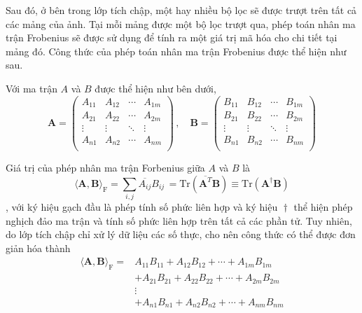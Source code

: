 Sau đó, ở bên trong lớp tích chập, một hay nhiều bộ lọc sẽ được trượt trên tất cả các mảng của ảnh. Tại mỗi mảng được một bộ lọc trượt qua, phép toán nhân ma trận Frobenius sẽ được sử dụng để tính ra một giá trị mã hóa cho chi tiết tại mảng đó. Công thức của phép toán nhân ma trận Frobenius được thể hiện như sau.

Với ma trận $A$ và $B$ được thể hiện như bên dưới,
\begin{equation}
  {\displaystyle \mathbf {A} ={\begin{pmatrix}A_{11}&A_{12}&\cdots &A_{1m}\\A_{21}&A_{22}&\cdots &A_{2m}\\\vdots &\vdots &\ddots &\vdots \\A_{n1}&A_{n2}&\cdots &A_{nm}\\\end{pmatrix}}\,,\quad \mathbf {B} ={\begin{pmatrix}B_{11}&B_{12}&\cdots &B_{1m}\\B_{21}&B_{22}&\cdots &B_{2m}\\\vdots &\vdots &\ddots &\vdots \\B_{n1}&B_{n2}&\cdots &B_{nm}\\\end{pmatrix}}}
\end{equation}

Giá trị của phép nhân ma trận Forbenius giữa $A$ và $B$ là
\begin{equation}
  {\displaystyle \langle \mathbf {A} ,\mathbf {B} \rangle _{\mathrm {F} }=\sum _{i,j}{\overline {A_{ij}}}B_{ij}\,=\mathrm {Tr} \left({\overline {\mathbf {A} ^{T}}}\mathbf {B} \right)\equiv \mathrm {Tr} \left(\mathbf {A} ^{\!\dagger }\mathbf {B} \right)}
\end{equation},
với ký hiệu gạch đầu là phép tính số phức liên hợp và ký hiệu $\!\dagger$ thể hiện phép nghịch đảo ma trận và tính số phức liên hợp trên tất cả các phần tử. Tuy nhiên, do lớp tích chập chỉ xử lý dữ liệu các số thực, cho nên công thức có thể được đơn giản hóa thành
\begin{equation}
  {\displaystyle {\begin{aligned}\langle \mathbf {A} ,\mathbf {B} \rangle _{\mathrm {F} }=&{ {A}}_{11}B_{11}+{ {A}}_{12}B_{12}+\cdots +{ {A}}_{1m}B_{1m}\\&+{ {A}}_{21}B_{21}+{ {A}}_{22}B_{22}+\cdots +{ {A}}_{2m}B_{2m}\\&\vdots \\&+{ {A}}_{n1}B_{n1}+{ {A}}_{n2}B_{n2}+\cdots +{ {A}}_{nm}B_{nm}\\\end{aligned}}}
\end{equation}

